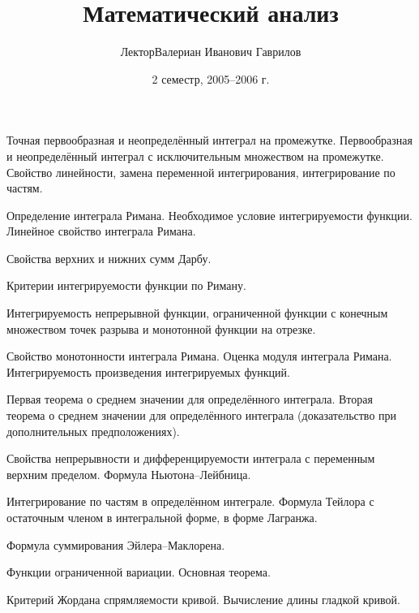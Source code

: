 \documentclass[a4paper]{article}
\title{Математический анализ}
\author{Лектор\т Валериан Иванович Гаврилов}
\date{2 семестр, 2005--2006 г.}
\begin{document}
\maketitle


\medskip\dmvntrail

\begin{nums}{-1}
\item Точная первообразная и неопределённый интеграл на промежутке.
Первообразная и неопределённый интеграл с исключительным множеством
на промежутке. Свойство линейности, замена переменной
интегрирования, интегрирование по частям.

\item Определение интеграла Римана. Необходимое условие
интегрируемости функции. Линейное свойство интеграла Римана.

\item Свойства верхних и нижних сумм Дарбу.

\item Критерии интегрируемости функции по Риману.

\item Интегрируемость непрерывной функции, ограниченной функции с
конечным множеством точек разрыва и монотонной функции на отрезке.

\item Свойство монотонности интеграла Римана. Оценка модуля
интеграла Римана. Интегрируемость произведения интегрируемых
функций.

\item Первая теорема о среднем значении для определённого интеграла.
Вторая теорема о среднем значении для определённого интеграла
(доказательство при дополнительных предположениях).

\item Свойства непрерывности и дифференцируемости интеграла с
переменным верхним пределом. Формула Ньютона--Лейбница.

\item Интегрирование по частям в определённом интеграле. Формула
Тейлора с остаточным членом в интегральной форме, в форме Лагранжа.

\item Формула суммирования Эйлера--Маклорена.

\item Функции ограниченной вариации. Основная теорема.

\item Критерий Жордана спрямляемости кривой. Вычисление длины
гладкой кривой.


\end{nums}
\end{document}

